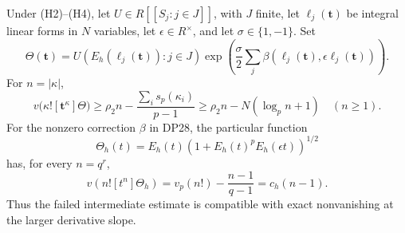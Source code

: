 \begin{proposition}\label{DP29}
Under (H2)--(H4), let $U\in R[[S_j:j\in J]]$, with $J$ finite, let $\ell_j(\mathbf t)$ be integral linear forms in $N$ variables, let $\epsilon\in R^\times$, and let $\sigma\in\{1,-1\}$. Set
\[
 \Theta(\mathbf t)=U(E_h(\ell_j(\mathbf t)):j\in J)
 \exp\left(\frac\sigma2\sum_j\beta(\ell_j(\mathbf t),\epsilon\ell_j(\mathbf t))\right).
\]
For $n=|\kappa|$,
\begin{equation}\label{eq:scalar-old-residual}
 v\bigl(\kappa![\mathbf t^\kappa]\Theta\bigr)
 \ge \rho_2n-\frac{\sum_i s_p(\kappa_i)}{p-1}
 \ge\rho_2n-N(\log_p n+1)\quad(n\ge1).
\end{equation}
For the nonzero correction $\beta$ in DP28, the particular function
\[
 \Theta_h(t)=E_h(t)\left(1+E_h(t)^pE_h(\epsilon t)\right)^{1/2}
\]
has, for every $n=q^r$,
\begin{equation}\label{eq:sharp-corrected-scalar}
 v(n![t^n]\Theta_h)=v_p(n!)-\frac{n-1}{q-1}=c_h(n-1).
\end{equation}
Thus the failed intermediate estimate is compatible with exact nonvanishing at the larger derivative slope.
\end{proposition}
